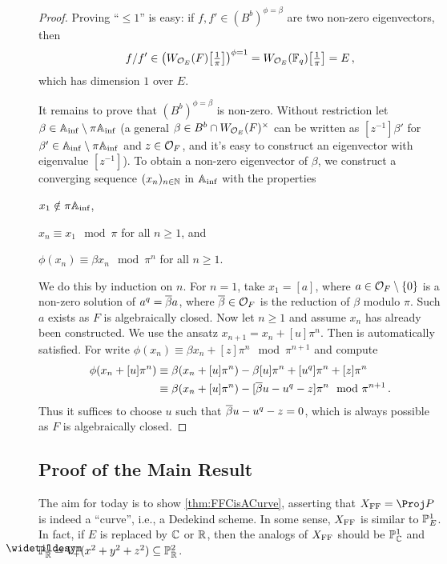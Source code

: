 \begin{proof}
	Proving \enquote{$\leq 1$} is easy: if $f,f'\in (B^b)^{\phi=\beta}$ are two non-zero eigenvectors, then
	\begin{equation*}
		f/f'\in\left(W_{\Oo_E}(F)\localize{\pi}\right)^{\phi=1}=W_{\Oo_E}(\IF_q)\localize{\pi}=E\,,
	\end{equation*}
	which has dimension $1$ over $E$.
	
	It remains to prove that $(B^b)^{\phi=\beta}$ is non-zero. Without restriction let $\beta\in\mathbb{A}_{\mathrm{inf}}\setminus\pi\mathbb{A}_{\mathrm{inf}}$ (a general $\beta\in B^b\cap W_{\mathcal{O}_E}(F)^\times$ can be written as $[z^{-1}]\beta'$ for $\beta'\in \mathbb{A}_{\mathrm{inf}}\setminus \pi\mathbb{A}_{\mathrm{inf}}$ and $z\in \mathcal{O}_F$, and it's easy to construct an eigenvector with eigenvalue $[z^{-1}]$). To obtain a non-zero eigenvector of $\beta$, we construct a converging sequence $(x_n)_{n\in\mathbb{N}}$ in $\mathbb{A}_{\mathrm{inf}}$ with the properties
	\begin{numerate}
		\item $x_1\notin\pi\mathbb{A}_{\mathrm{inf}}$,
		\item $x_n\equiv x_1\mod \pi$ for all $n\geq 1$, and
		\item $\phi(x_n)\equiv \beta x_n\mod\pi^n$ for all $n\geq 1$.
	\end{numerate}
	We do this by induction on $n$. For $n=1$, take $x_1=[a]$, where $a\in \mathcal{O}_F\setminus\{0\}$ is a non-zero solution of $a^q=\ov{\beta }a$, where $\ov{\beta}\in \Oo_F$ is the reduction of $\beta$ modulo $\pi$. Such $a$ exists as $F$ is algebraically closed. Now let $n\geq1$ and assume $x_n$ has already been constructed. We use the ansatz $x_{n+1}=x_n+[u]\pi^n$. Then  is automatically satisfied. For  write $\phi(x_n)\equiv \beta x_n+[z]\pi^n\mod \pi^{n+1}$ and compute
	\begin{align*}
		\phi(x_n+[u]\pi^n)&\equiv \beta(x_n+[u]\pi^n)-\beta[u]\pi^n+[u^q]\pi^n+[z]\pi^n\\
		&\equiv \beta(x_n+[u]\pi^n)-[\ov{\beta}u-u^q-z]\pi^n\mod \pi^{n+1}\,.
	\end{align*}
	Thus it suffices to choose $u$ such that $\ov{\beta}u-u^q-z=0$, which is always possible as $F$ is algebraically closed.
\end{proof}
\subsection{Proof of the Main Result}
The aim for today is to show \cref{thm:FFCisACurve}, asserting that $X_\FFC=\Proj P$ is indeed a \enquote{curve}, i.e., a Dedekind scheme. In some sense, $X_{\mathrm{FF}}$ is similar to $\mathbb{P}_E^1$. In fact, if $E$ is replaced by $\mathbb{C}$ or $\mathbb{R}$, then the analogs of $X_{\mathrm{FF}}$ should be $\mathbb{P}_{\mathbb{C}}^1$ and $\snake{\IP}_\IR^1=V_+(x^2+y^2+z^2)\subseteq \IP_\IR^2$.

